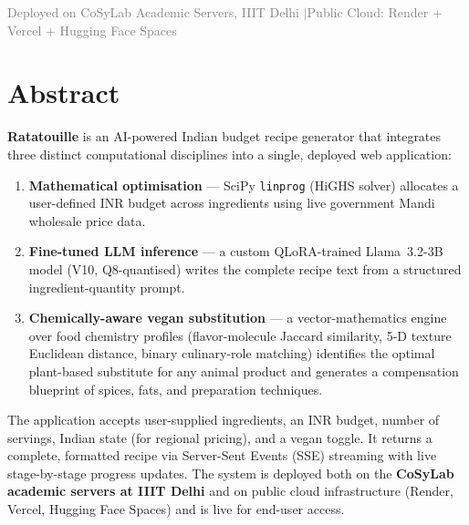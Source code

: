 \documentclass[12pt, a4paper]{article}
\begin{document}
\begin{titlepage}
\vfill
{\small \textcolor{gray}{Deployed on CoSyLab Academic Servers, IIIT Delhi
\quad$|$\quad Public Cloud: Render + Vercel + Hugging Face Spaces}}

\end{titlepage}

\newpage
\tableofcontents
\newpage

\section{Abstract}

\textbf{Ratatouille} is an AI-powered Indian budget recipe generator that integrates three
distinct computational disciplines into a single, deployed web application:

\begin{enumerate}
  \item \textbf{Mathematical optimisation} --- SciPy \texttt{linprog} (HiGHS solver) allocates a user-defined INR budget across ingredients using live government Mandi wholesale price data.
  \item \textbf{Fine-tuned LLM inference} --- a custom QLoRA-trained Llama~3.2-3B model (V10, Q8-quantised) writes the complete recipe text from a structured ingredient-quantity prompt.
  \item \textbf{Chemically-aware vegan substitution} --- a vector-mathematics engine over food chemistry profiles (flavor-molecule Jaccard similarity, 5-D texture Euclidean distance, binary culinary-role matching) identifies the optimal plant-based substitute for any animal product and generates a compensation blueprint of spices, fats, and preparation techniques.
\end{enumerate}

The application accepts user-supplied ingredients, an INR budget, number of servings, Indian
state (for regional pricing), and a vegan toggle.  It returns a complete, formatted recipe
via Server-Sent Events (SSE) streaming with live stage-by-stage progress updates.  The system
is deployed both on the \textbf{CoSyLab academic servers at IIIT Delhi} and on public cloud
infrastructure (Render, Vercel, Hugging Face Spaces) and is live for end-user access.
\end{document}
